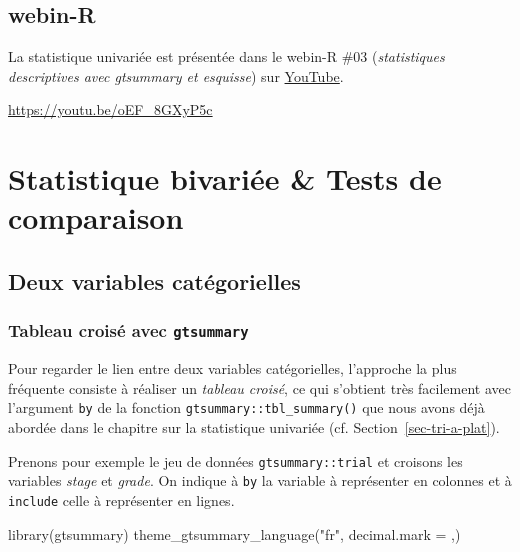 \documentclass[
  letterpaper,
  DIV=11,
  numbers=noendperiod,
  oneside]{scrreprt}
\newenvironment{Shaded}{\begin{snugshade}}{\end{snugshade}}
\newcommand{\AttributeTok}[1]{\textcolor[rgb]{0.40,0.45,0.13}{#1}}
\newcommand{\FunctionTok}[1]{\textcolor[rgb]{0.28,0.35,0.67}{#1}}
\newcommand{\NormalTok}[1]{\textcolor[rgb]{0.00,0.23,0.31}{#1}}
\newcommand{\StringTok}[1]{\textcolor[rgb]{0.13,0.47,0.30}{#1}}
\begin{document}
\hypertarget{webin-r-5}{%
\section{webin-R}\label{webin-r-5}}

La statistique univariée est présentée dans le webin-R \#03
(\emph{statistiques descriptives avec gtsummary et esquisse}) sur
\href{https://youtu.be/oEF_8GXyP5c?t=1380}{YouTube}.

\url{https://youtu.be/oEF_8GXyP5c}

\hypertarget{sec-statistique-bivariee}{%
\chapter{Statistique bivariée \& Tests de
comparaison}\label{sec-statistique-bivariee}}

\hypertarget{deux-variables-catuxe9gorielles}{%
\section{Deux variables
catégorielles}\label{deux-variables-catuxe9gorielles}}

\hypertarget{tableau-croisuxe9-avec-gtsummary}{%
\subsection{\texorpdfstring{Tableau croisé avec
\texttt{gtsummary}}{Tableau croisé avec gtsummary}}\label{tableau-croisuxe9-avec-gtsummary}}

Pour regarder le lien entre deux variables catégorielles, l'approche la
plus fréquente consiste à réaliser un \emph{tableau croisé}, ce qui
s'obtient très facilement avec l'argument \texttt{by} de la fonction
\texttt{gtsummary::tbl\_summary()} que nous avons déjà abordée dans le
chapitre sur la statistique univariée (cf.
Section~\ref{sec-tri-a-plat}).

Prenons pour exemple le jeu de données \texttt{gtsummary::trial} et
croisons les variables \emph{stage} et \emph{grade}. On indique à
\texttt{by} la variable à représenter en colonnes et à \texttt{include}
celle à représenter en lignes.

\begin{Shaded}
\begin{Highlighting}[]
\FunctionTok{library}\NormalTok{(gtsummary)}
\FunctionTok{theme\_gtsummary\_language}\NormalTok{(}\StringTok{"fr"}\NormalTok{, }\AttributeTok{decimal.mark =} \StringTok{\textquotesingle{},\textquotesingle{}}\NormalTok{)}
\end{Highlighting}
\end{Shaded}
\end{document}
